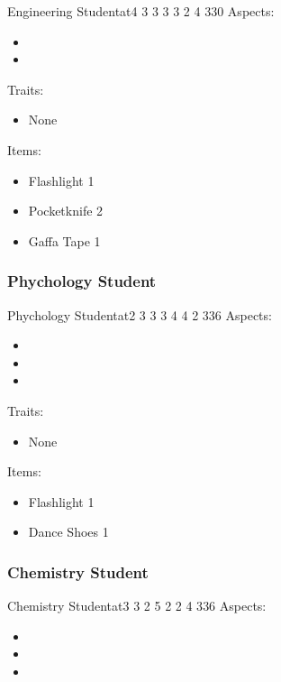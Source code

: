 \documentclass[11pt]{article}
\begin{document}
{\begin{npc}{Engineering Student}{at}{4 3 3 3 3 2 4 3}{30}
Aspects:
\begin{itemize}
\item {}
\item {}
\end{itemize}
\columnbreak

Traits:
\begin{itemize}
\item None
\end{itemize}

Items:
\begin{itemize}
\item Flashlight 1
\item Pocketknife 2
\item Gaffa Tape 1
\end{itemize}
\end{npc}
\subsubsection{Phychology Student}
\label{sec:org18759e6}

\begin{npc}{Phychology Student}{at}{2 3 3 3 4 4 2 3}{36}
Aspects:
\begin{itemize}
\item {}
\item {}
\item {}
\end{itemize}
\columnbreak

Traits:
\begin{itemize}
\item None
\end{itemize}

Items:
\begin{itemize}
\item Flashlight 1
\item Dance Shoes 1
\end{itemize}
\end{npc}
\subsubsection{Chemistry Student}
\label{sec:org14c7980}

\begin{npc}{Chemistry Student}{at}{3 3 2 5 2 2 4 3}{36}
Aspects:
\begin{itemize}
\item {}
\item {}
\item {}
\end{itemize}
\columnbreak


\end{npc}}
\end{document}
